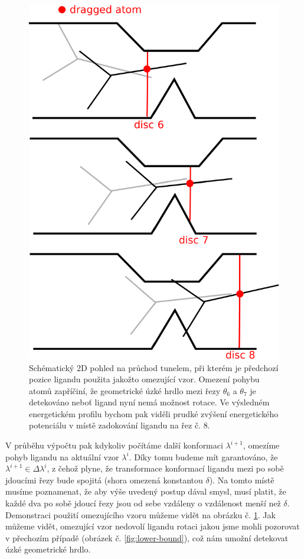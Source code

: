 \begin{figure}[t]
\centering
\includegraphics[width=.5\hsize]{img/tun-2.pdf}
\caption{Schématický 2D pohled na průchod tunelem, při kterém je předchozí pozice
ligandu použita jakožto omezující vzor. Omezení pohybu atomů zapříčiní, že geometrické
úzké hrdlo mezi řezy $\theta_6$ a $\theta_7$ je detekováno neboť ligand nyní
nemá možnost rotace. Ve výsledném energetickém profilu bychom pak viděli prudké
zvýšení energetického potenciálu v místě zadokování ligandu na řez č. 8.}
\label{fig:continuous_transition}
\end{figure}

V průběhu výpočtu pak kdykoliv počítáme další konformaci $ \lambda^{i+1} $,
omezíme pohyb ligandu na aktuální vzor $ \lambda^{i} $. Díky tomu budeme mít
garantováno, že $ \lambda^{i+1} \in \Delta \lambda^i $, z čehož plyne, že
transformace konformací ligandu mezi po sobě jdoucími řezy bude spojitá
(shora omezená konstantou $ \delta $). Na tomto místě musíme poznamenat, že aby
výše uvedený postup dával smysl, musí platit, že každé dva po sobě jdoucí řezy jsou
od sebe vzdáleny o vzdálenost menší než $ \delta $. Demonstraci použití
omezujícího vzoru můžeme vidět na obrázku č. \ref{fig:continuous_transition}. Jak
můžeme vidět, omezující vzor nedovolí ligandu rotaci jakou jsme mohli pozorovat
v přechozím případě (obrázek č. \ref{fig:lower-bound}), což nám umožní detekovat
úzké geometrické hrdlo.





